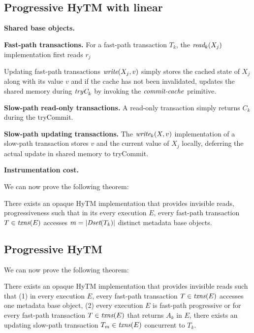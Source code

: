 \subsection{Progressive HyTM with linear}
\label{sec:hytm1}
%

%
%
\vspace{1mm}\noindent\textbf{Shared base objects.}


\vspace{1mm}\noindent\textbf{Fast-path transactions.}
For a fast-path transaction $T_k$, the $\textit{read}_k(X_j)$ implementation first reads $r_j$ 

Updating fast-path transactions 
$\textit{write} (X_j,v)$ simply stores the cached state of $X_j$ along with its value $v$ and
if the cache has not been invalidated, updates the shared memory
during $\textit{tryC}_k$ by invoking the $\ms{commit-cache}$ primitive.

\vspace{1mm}\noindent\textbf{Slow-path read-only transactions.}
A read-only transaction simply returns $C_k$ during the tryCommit.

\vspace{1mm}\noindent\textbf{Slow-path updating transactions.}
The $\textit{write}_k(X,v)$ implementation of a slow-path transaction stores
$v$ and the current value of $X_j$ locally, 
deferring the actual update in shared memory to tryCommit. 


\vspace{1mm}\noindent\textbf{Instrumentation cost.}
%

We can now prove the following theorem:
%
\begin{theorem}
\label{th:inswrite}
There exists an opaque HyTM implementation that provides invisible reads, progressiveness
such that
in its every execution $E$, every fast-path transaction $T\in \ms{txns}(E)$
accesses $m=|\textit{Dset}(T_k)|$ distinct metadata base objects.
\end{theorem}
%
\begin{proofsketch}

\end{proofsketch}
%
%

\subsection{Progressive HyTM}
\label{sec:hytm2}
%
We can now prove the following theorem:
%
\begin{theorem}
\label{th:inswrite2}
There exists an opaque HyTM implementation that provides invisible reads
such that (1) in every execution $E$,
every fast-path transaction $T\in \ms{txns}(E)$
accesses one metadata base object,
(2) every execution $E$ is fast-path progressive or for
every fast-path transaction $T\in \ms{txns}(E)$
that returns $A_k$ in $E$, there exists an updating slow-path transaction $T_m \in \ms{txns}(E)$
concurrent to $T_k$.
\end{theorem}
%
\begin{proofsketch}
% 
\end{proofsketch}
%